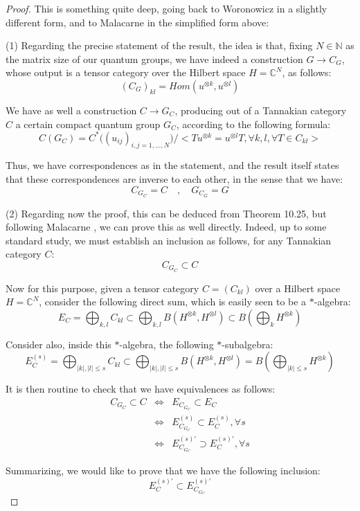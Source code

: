 \documentclass[12pt]{amsbook}
\begin{document}
\begin{proof}
This is something quite deep, going back to Woronowicz \cite{wo2} in a slightly different form, and to Malacarne \cite{mal} in the simplified form above:

\medskip

(1) Regarding the precise statement of the result, the idea is that, fixing $N\in\mathbb N$ as the matrix size of our quantum groups, we have indeed a construction $G\to C_G$, whose output is a tensor category over the Hilbert space $H=\mathbb C^N$, as follows:
$$(C_G)_{kl}=Hom(u^{\otimes k},u^{\otimes l})$$

We have as well a construction $C\to G_C$, producing out of a Tannakian category $C$ a certain compact quantum group $G_C$, according to the following formula:
$$C(G_C)=C^*\Big((u_{ij})_{i,j=1,\ldots,N}\Big)\Big/\Big<Tu^{\otimes k}=u^{\otimes l}T,\forall k,l,\forall T\in C_{kl}\Big>$$

Thus, we have correspondences as in the statement, and the result itself states that these correspondences are inverse to each other, in the sense that we have:
$$C_{G_C}=C\quad,\quad G_{C_G}=G$$

(2) Regarding now the proof, this can be deduced from Theorem 10.25, but following Malacarne \cite{mal}, we can prove this as well directly. Indeed, up to some standard study, we must establish an inclusion as follows, for any Tannakian category $C$:
$$C_{G_C}\subset C$$

Now for this purpose, given a tensor category $C=(C_{kl})$ over a Hilbert space $H=\mathbb C^N$, consider the following direct sum, which is easily seen to be a $*$-algebra:
$$E_C
=\bigoplus_{k,l}C_{kl}
\subset\bigoplus_{k,l}B(H^{\otimes k},H^{\otimes l})
\subset B\left(\bigoplus_kH^{\otimes k}\right)$$

Consider also, inside this $*$-algebra, the following $*$-subalgebra:
$$E_C^{(s)}
=\bigoplus_{|k|,|l|\leq s}C_{kl}
\subset\bigoplus_{|k|,|l|\leq s}B(H^{\otimes k},H^{\otimes l})
=B\left(\bigoplus_{|k|\leq s}H^{\otimes k}\right)$$

It is then routine to check that we have equivalences as follows:
\begin{eqnarray*}
C_{G_C}\subset C
&\iff&E_{C_{G_C}}\subset E_C\\
&\iff&E_{C_{G_C}}^{(s)}\subset E_C^{(s)},\forall s\\
&\iff&E_{C_{G_C}}^{(s)'}\supset E_C^{(s)'},\forall s
\end{eqnarray*}

Summarizing, we would like to prove that we have the following inclusion:
$$E_C^{(s)'}\subset E_{C_{G_C}}^{(s)'}$$


\end{proof}
\end{document}
